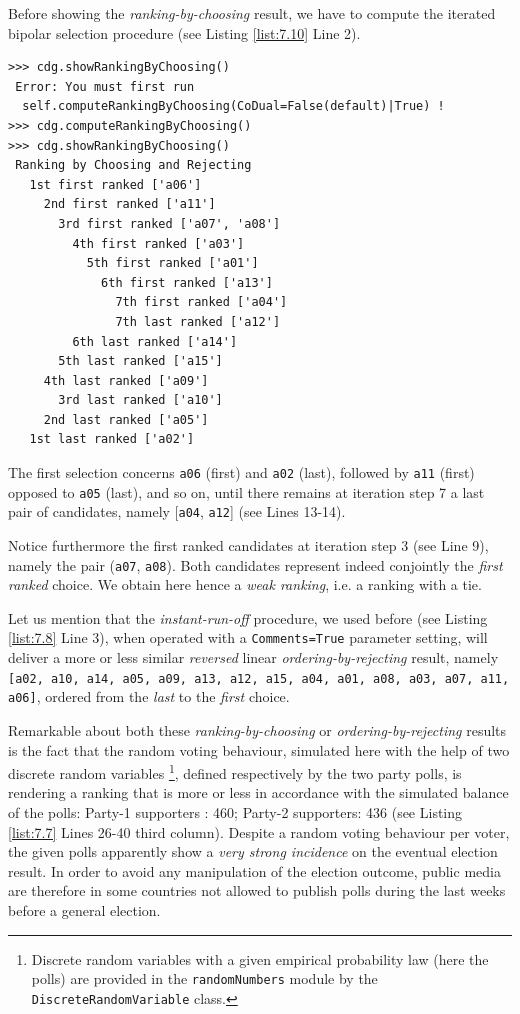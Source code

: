Before showing the \emph{ranking-by-choosing} result, we have to compute the iterated bipolar selection procedure (see Listing \ref{list:7.10} Line 2).
\begin{lstlisting}[caption={Ranking by iterating choosing the \emph{first} and \emph{last} remaining candidates },label=list:7.10]
>>> cdg.showRankingByChoosing()
 Error: You must first run
  self.computeRankingByChoosing(CoDual=False(default)|True) !
>>> cdg.computeRankingByChoosing()
>>> cdg.showRankingByChoosing()
 Ranking by Choosing and Rejecting
   1st first ranked ['a06']
     2nd first ranked ['a11']
       3rd first ranked ['a07', 'a08']
         4th first ranked ['a03']
           5th first ranked ['a01']
             6th first ranked ['a13']
               7th first ranked ['a04']
               7th last ranked ['a12']
	     6th last ranked ['a14']
	   5th last ranked ['a15']
	 4th last ranked ['a09']
       3rd last ranked ['a10']
     2nd last ranked ['a05']
   1st last ranked ['a02']
\end{lstlisting}
The first selection concerns \texttt{a06} (first) and \texttt{a02} (last), followed by \texttt{a11} (first) opposed to \texttt{a05} (last), and so on, until there remains at iteration step 7 a last pair of candidates, namely [\texttt{a04}, \texttt{a12}] (see Lines 13-14).

Notice furthermore the first ranked candidates at iteration step 3 (see Line 9), namely the pair (\texttt{a07}, \texttt{a08}). Both candidates represent indeed conjointly the \emph{first ranked} choice. We obtain here hence a \emph{weak ranking}, i.e. a ranking with a tie.

Let us mention that the \emph{instant-run-off} procedure, we used before (see Listing \ref{list:7.8} Line 3), when operated with a \texttt{Comments=True} parameter setting, will deliver a more or less similar \emph{reversed} linear \emph{ordering-by-rejecting} result, namely \texttt{[a02, a10, a14, a05, a09, a13, a12, a15, a04, a01, a08, a03, a07, a11, a06]}, ordered from the \emph{last} to the \emph{first} choice.

Remarkable about both these \emph{ranking-by-choosing} or \emph{ordering-by-rejecting} results is the fact that the random voting behaviour, simulated here with the help of two discrete random variables \footnote{Discrete random variables with a given empirical probability law (here the polls) are provided in the \texttt{randomNumbers} module by the \texttt{DiscreteRandomVariable} class.}, defined respectively by the two party polls, is rendering a ranking that is more or less in accordance with the simulated balance of the polls: Party-1 supporters : 460;  Party-2 supporters: 436 (see Listing \ref{list:7.7} Lines 26-40 third column). Despite a random voting behaviour per voter, the given polls apparently show a \emph{very strong incidence} on the eventual election result. In order to avoid any manipulation of the election outcome, public media are therefore in some countries not allowed to publish polls during the last weeks before a general election.

